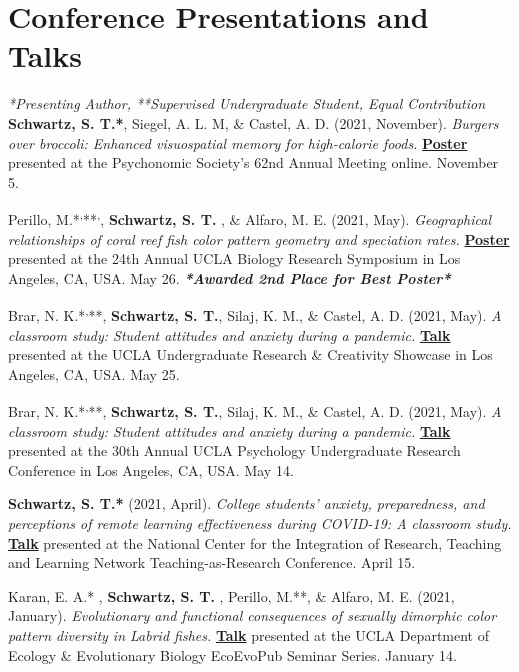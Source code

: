 \section*{Conference Presentations and Talks}
\textit{*Presenting Author, **Supervised Undergraduate Student, \dag{} Equal Contribution}\\

\textbf{Schwartz, S. T.*}, Siegel, A. L. M, \& Castel, A. D. (2021, November). \textit{Burgers over broccoli: Enhanced visuospatial memory for high-calorie foods.} \textbf{\underline{Poster}} presented at the Psychonomic Society's 62nd Annual Meeting online. November 5.

\pubspace

Perillo, M.*\textsuperscript{,}**\textsuperscript{,}\dag, \textbf{Schwartz, S. T. \dag}, \& Alfaro, M. E. (2021, May). \textit{Geographical relationships of coral reef fish color pattern geometry and speciation rates.} \textbf{\underline{Poster}} presented at the 24th Annual UCLA Biology Research Symposium in Los Angeles, CA, USA. May 26. \textbf{\textit{*Awarded 2nd Place for Best Poster*}}

\pubspace

Brar, N. K.*\textsuperscript{,}**, \textbf{Schwartz, S. T.}, Silaj, K. M., \& Castel, A. D. (2021, May). \textit{A classroom study: Student attitudes and anxiety during a pandemic.} \textbf{\underline{Talk}} presented at the UCLA Undergraduate Research \& Creativity Showcase in Los Angeles, CA, USA. May 25.

\pubspace

Brar, N. K.*\textsuperscript{,}**, \textbf{Schwartz, S. T.}, Silaj, K. M., \& Castel, A. D. (2021, May). \textit{A classroom study: Student attitudes and anxiety during a pandemic.} \textbf{\underline{Talk}} presented at the 30th Annual UCLA Psychology Undergraduate Research Conference in Los Angeles, CA, USA. May 14.

\pubspace

\textbf{Schwartz, S. T.*} (2021, April). \textit{College students’ anxiety, preparedness, and perceptions of remote learning effectiveness during COVID-19: A classroom study.} \textbf{\underline{Talk}} presented at the National Center for the Integration of Research, Teaching and Learning Network Teaching-as-Research Conference. April 15.

\pubspace

Karan, E. A.* \dag, \textbf{Schwartz, S. T. \dag}, Perillo, M.**, \& Alfaro, M. E. (2021, January). \textit{Evolutionary and functional consequences of sexually dimorphic color pattern diversity in Labrid fishes.} \textbf{\underline{Talk}} presented at the UCLA Department of Ecology \& Evolutionary Biology EcoEvoPub Seminar Series. January 14.

